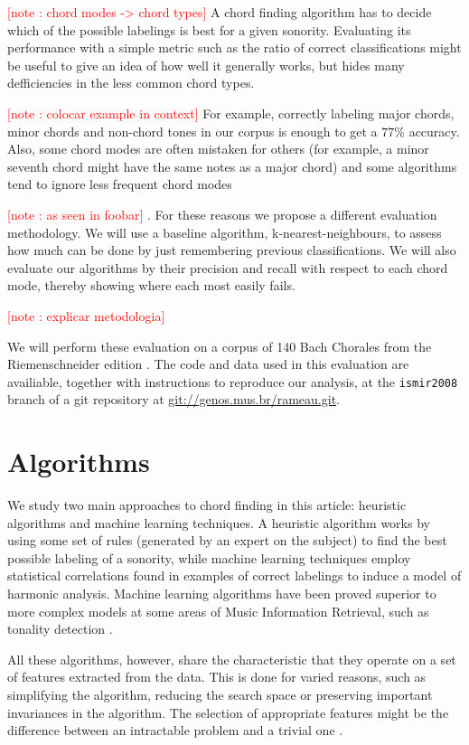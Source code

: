 \documentclass{article}
\newcounter{notecounter}
\newcommand{\note}[1]{
  \addtocounter{notecounter}{1}
  \textcolor{red}{[note \arabic{notecounter}: #1]}
}
\begin{document}
\note{chord modes -> chord types} A chord finding algorithm has to
decide which of the possible labelings is best for a given sonority.
Evaluating its performance with a simple metric such as the ratio of
correct classifications might be useful to give an idea of how well it
generally works, but hides many defficiencies in the less common chord
types. \note{colocar example in context} For example, correctly
labeling major chords, minor chords and non-chord tones in our corpus
is enough to get a $77\%$ accuracy. Also, some chord modes are often
mistaken for others (for example, a minor seventh chord might have the
same notes as a major chord) and some algorithms tend to ignore less
frequent chord modes \note{as seen in foobar}. For these reasons we
propose a different evaluation methodology. We will use a baseline
algorithm, k-nearest-neighbours, to assess how much can be done by
just remembering previous classifications. We will also evaluate our
algorithms by their precision and recall with respect to each chord
mode, thereby showing where each most easily fails. \note{explicar
  metodologia}

We will perform these evaluation on a corpus of 140 Bach Chorales from
the Riemenschneider edition \cite{bach:371}. The code and data used in
this evaluation are availiable, together with instructions to
reproduce our analysis, at the \texttt{ismir2008} branch of a git
\cite{baudis:git} repository at \url{git://genos.mus.br/rameau.git}.

\section{Algorithms}
\label{sec:algorithms}


We study two main approaches to chord finding in this article:
heuristic algorithms and machine learning techniques. A heuristic
algorithm works by using some set of rules (generated by an expert on
the subject) to find the best possible labeling of a sonority, while
machine learning techniques employ statistical correlations found in
examples of correct labelings to induce a model of harmonic
analysis. Machine learning algorithms have been proved superior to
more complex models at some areas of Music Information Retrieval, such
as tonality detection \cite{gomez.ea:estimating}.

All these algorithms, however, share the characteristic that they
operate on a set of features extracted from the data. This is done for
varied reasons, such as simplifying the algorithm, reducing the search
space or preserving important invariances in the algorithm. The
selection of appropriate features might be the difference between an
intractable problem and a trivial one \cite{duda.ea:statistical}.
\end{document}
